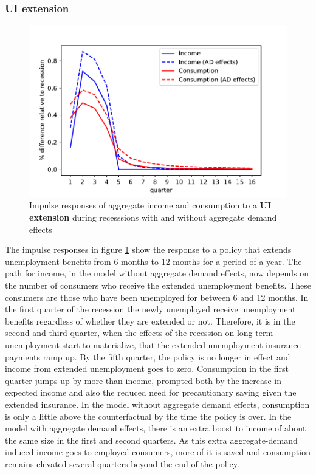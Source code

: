 \documentclass[../HAFiscal]{subfiles}
\begin{document}
\subsubsection{UI extension}

\begin{figure}
	\centering
	\includegraphics[width=0.8\linewidth]{Code/HA-Models/FromPandemicCode/Figures/recession_UI_relrecession}
	\caption{Impulse responses of aggregate income and consumption to a \textbf{UI extension} during recesssions with and without aggregate demand effects}
	\label{fig:recessionuirelrecession}
\end{figure}

The impulse responses in figure \ref{fig:recessionuirelrecession} show the response to a policy that extends unemployment benefits from 6 months to 12 months for a period of a year. The path for income, in the model without aggregate demand effects, now depends on the number of consumers who receive the extended unemployment benefits. These consumers are those who have been unemployed for between 6 and 12 months. In the first quarter of the recession the newly unemployed receive unemployment benefits regardless of whether they are extended or not. Therefore, it is in the second and third quarter, when the effects of the recession on long-term unemployment start to materialize, that the extended unemployment insurance payments ramp up. By the fifth quarter, the policy is no longer in effect and income from extended unemployment goes to zero. Consumption in the first quarter jumps up by more than income, prompted both by the increase in expected income and also the reduced need for precautionary saving given the extended insurance. In the model without aggregate demand effects, consumption is only a little above the counterfactual by the time the policy is over. In the model with aggregate demand effects, there is an extra boost to income of about the same size in the first and second quarters. As this extra aggregate-demand induced income goes to employed consumers, more of it is saved and consumption remains elevated several quarters beyond the end of the policy.
\end{document}
